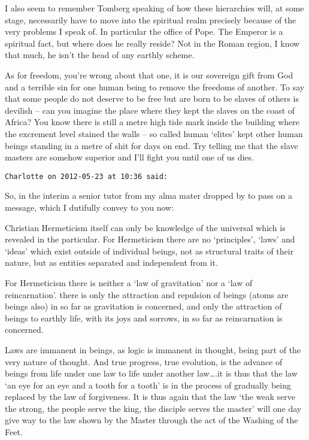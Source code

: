 \begin{footnotesize}
\begin{sffamily}
I also seem to remember Tomberg speaking of how these hierarchies will, at some stage, necessarily have to move into the spiritual realm precisely because of the very problems I speak of. In particular the office of Pope. The Emperor is a spiritual fact, but where does he really reside? Not in the Roman region, I know that much, he isn't the head of any earthly scheme.

As for freedom, you're wrong about that one, it is our sovereign gift from God and a terrible sin for one human being to remove the freedoms of another. To say that some people do not deserve to be free but are born to be slaves of others is devilish – can you imagine the place where they kept the slaves on the coast of Africa? You know there is still a metre high tide mark inside the building where the excrement level stained the walls – so called human `elites' kept other human beings standing in a metre of shit for days on end. Try telling me that the slave masters are somehow superior and I'll fight you until one of us dies.


\hfill

\texttt{Charlotte on 2012-05-23 at 10:36 said: }

So, in the interim a senior tutor from my alma mater dropped by to pass on a message, which I dutifully convey to you now:

Christian Hermeticism itself can only be knowledge of the universal which is revealed in the particular. For Hermeticism there are no `principles’, ‘laws' and `ideas' which exist outside of individual beings, not as structural traits of their nature, but as entities separated and independent from it.

For Hermeticism there is neither a `law of gravitation' nor a `law of reincarnation'. there is only the attraction and repulsion of beings (atoms are beings also) in so far as gravitation is concerned, and only the attraction of beings to earthly life, with its joys and sorrows, in so far as reincarnation is concerned.

Laws are immanent in beings, as logic is immanent in thought, being part of the very nature of thought. And true progress, true evolution, is the advance of beings from life under one law to life under another law….it is thus that the law `an eye for an eye and a tooth for a tooth' is in the process of gradually being replaced by the law of forgiveness. It is thus again that the law `the weak serve the strong, the people serve the king, the disciple serves the master' will one day give way to the law shown by the Master through the act of the Washing of the Feet.


\end{sffamily}
\end{footnotesize}
